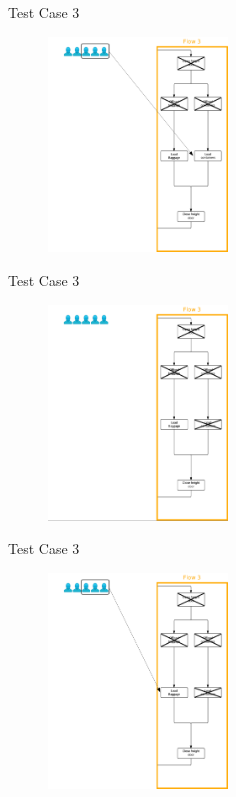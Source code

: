 \begin{frame}{Test Case 3}
\begin{figure}
    \centering
    \includegraphics[width=180px]{Grafik/Flow3/Flow3-3}
\end{figure}
\end{frame}

\begin{frame}{Test Case 3}
\begin{figure}
    \centering
    \includegraphics[width=180px]{Grafik/Flow3/Flow3-4-1}
\end{figure}
\end{frame}

\begin{frame}{Test Case 3}
\begin{figure}
    \centering
    \includegraphics[width=180px]{Grafik/Flow3/Flow3-4}
\end{figure}
\end{frame}

